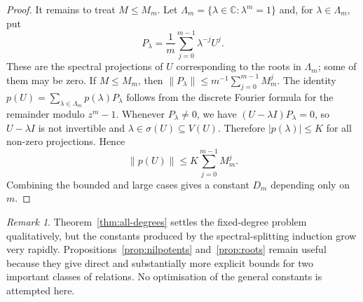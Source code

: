 \documentclass[a4paper]{amsart}
\theoremstyle{remark}
\newtheorem{remark}[theorem]{Remark}
\newcommand{\C}{\mathbb C}
\begin{document}
\begin{proof}
It remains to treat $M\leqslant M_m$.  Let $\Lambda_m=\{\lambda\in\C:\lambda^m=1\}$ and, for $\lambda\in\Lambda_m$, put
\[
       P_\lambda=\frac{1}{m}\sum_{j=0}^{m-1}\lambda^{-j}U^j .
\]
These are the spectral projections of $U$ corresponding to the roots in $\Lambda_m$; some of them may be zero.  If $M\leqslant M_m$, then
$\|P_\lambda\|\leqslant m^{-1}\sum_{j=0}^{m-1}M_m^j$.  The identity
$p(U)=\sum_{\lambda\in\Lambda_m}p(\lambda)P_\lambda$ follows from the discrete Fourier formula for the remainder modulo $z^m-1$.  Whenever $P_\lambda\neq0$, we have $(U-\lambda I)P_\lambda=0$, so $U-\lambda I$ is not invertible and $\lambda\in\sigma(U)\subseteq V(U)$.  Therefore $|p(\lambda)|\leqslant K$ for all non-zero projections.  Hence
\[
       \|p(U)\|\leqslant K\sum_{j=0}^{m-1}M_m^j .
\]
Combining the bounded and large cases gives a constant $D_m$ depending only on $m$.
\end{proof}

\begin{remark}
Theorem~\ref{thm:all-degrees} settles the fixed-degree problem qualitatively, but the constants produced by the spectral-splitting induction grow very rapidly.  Propositions~\ref{prop:nilpotents} and~\ref{prop:roots} remain useful because they give direct and substantially more explicit bounds for two important classes of relations.  No optimisation of the general constants is attempted here.
\end{remark}
\end{document}
